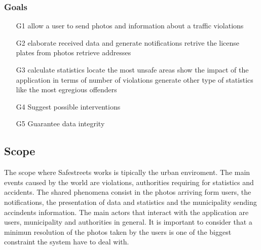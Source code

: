 \subsubsection{Goals}
\begin{itemize}
	\item
	[G1] allow a user to send photos and information about a traffic violations
	\item 
	[G2] elaborate received data and generate notifications
		\subitem 
		[G2.1] retrive the license plates from photos
		\subitem
		[G2.2] retrieve addresses
	\item
	[G3] calculate statistics
		\subitem
		[G3.1] locate the most unsafe areas
		\subitem
		[G3.2] show the impact of the application in terms of number of violations
		\subitem
		[G3.3] generate other type of statistics like the most egregious offenders
	\item
	[G4] Suggest possible interventions
	\item
	[G5] Guarantee data integrity
		
\end{itemize}
\subsection{Scope}
The scope where Safestreets works is tipically the urban enviroment. The main events caused by the world are violations, authorities requiring for statistics and accidents.
The shared phenomena consist in the photos arriving form users, the notifications, the presentation of data and statistics and the municipality sending accindents information.  
The main actors that interact with the application are users, municipality and authorities in general.
It is important to consider that a minimun resolution of the photos taken by the users is one of the biggest constraint the system have to deal with.
